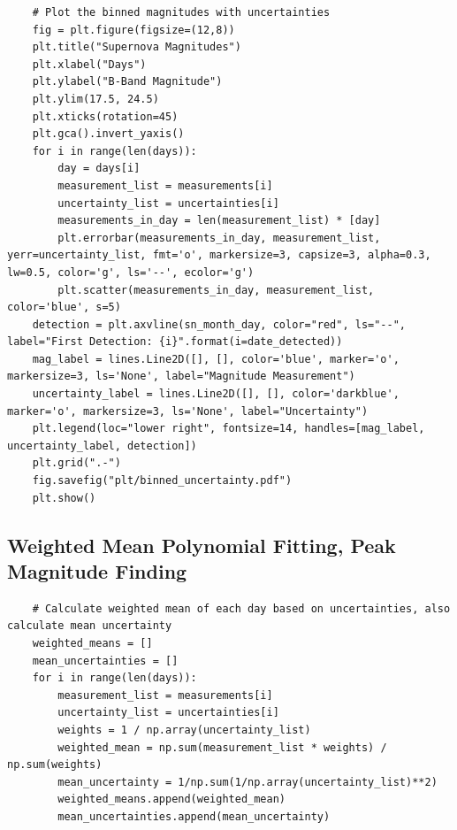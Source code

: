 \documentclass{article}
\begin{document}
\begin{appendices}
\begin{verbatim}
    # Plot the binned magnitudes with uncertainties
    fig = plt.figure(figsize=(12,8))
    plt.title("Supernova Magnitudes")
    plt.xlabel("Days")
    plt.ylabel("B-Band Magnitude")
    plt.ylim(17.5, 24.5)
    plt.xticks(rotation=45)
    plt.gca().invert_yaxis()
    for i in range(len(days)):
        day = days[i]
        measurement_list = measurements[i]
        uncertainty_list = uncertainties[i]
        measurements_in_day = len(measurement_list) * [day]
        plt.errorbar(measurements_in_day, measurement_list, yerr=uncertainty_list, fmt='o', markersize=3, capsize=3, alpha=0.3, lw=0.5, color='g', ls='--', ecolor='g')
        plt.scatter(measurements_in_day, measurement_list, color='blue', s=5)
    detection = plt.axvline(sn_month_day, color="red", ls="--", label="First Detection: {i}".format(i=date_detected))
    mag_label = lines.Line2D([], [], color='blue', marker='o', markersize=3, ls='None', label="Magnitude Measurement")
    uncertainty_label = lines.Line2D([], [], color='darkblue', marker='o', markersize=3, ls='None', label="Uncertainty")
    plt.legend(loc="lower right", fontsize=14, handles=[mag_label, uncertainty_label, detection])
    plt.grid(".-")
    fig.savefig("plt/binned_uncertainty.pdf")
    plt.show()
\end{verbatim}

\subsection{Weighted Mean Polynomial Fitting, Peak Magnitude Finding}
\begin{verbatim}
    # Calculate weighted mean of each day based on uncertainties, also calculate mean uncertainty
    weighted_means = []
    mean_uncertainties = []
    for i in range(len(days)):
        measurement_list = measurements[i]
        uncertainty_list = uncertainties[i]
        weights = 1 / np.array(uncertainty_list)
        weighted_mean = np.sum(measurement_list * weights) / np.sum(weights)
        mean_uncertainty = 1/np.sum(1/np.array(uncertainty_list)**2)
        weighted_means.append(weighted_mean)
        mean_uncertainties.append(mean_uncertainty)
    

\end{verbatim}
\end{appendices}
\end{document}
